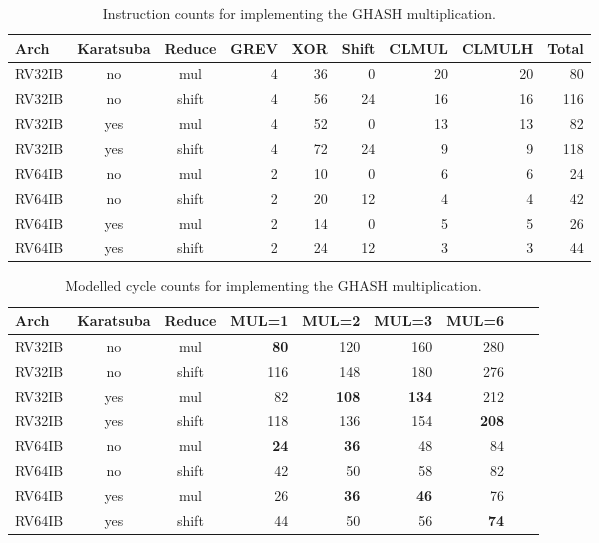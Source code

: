 \begin{table}
\centering
\begin{tabular}{lccrrrrrr}
Arch  & Karatsuba & Reduce & GREV & XOR & Shift & CLMUL & CLMULH & Total \\
\hline
RV32IB&   no      &   mul  &   4  & 36  &   0   &   20  &   20   & 80    \\
RV32IB&   no      & shift  &   4  & 56  &   24  &   16  &   16   & 116   \\
RV32IB&   yes     &   mul  &   4  & 52  &   0   &   13  &   13   & 82    \\
RV32IB&   yes     & shift  &   4  & 72  &   24  &   9   &   9    & 118   \\
\hline
RV64IB&   no      &   mul  &   2  & 10  &   0   &   6   &   6    & 24    \\
RV64IB&   no      & shift  &   2  & 20  &   12  &   4   &   4    & 42    \\
RV64IB&   yes     &   mul  &   2  & 14  &   0   &   5   &   5    & 26    \\
RV64IB&   yes     & shift  &   2  & 24  &   12  &   3   &   3    & 44    \\
\end{tabular}
\caption{
    Instruction counts for implementing the GHASH multiplication.
}
\label{tab:gcm:instrs}
\end{table}


\begin{table}
\centering
\begin{tabular}{lccrrrrrr}
Arch  & Karatsuba & Reduce &   MUL=1  &   MUL=2   &   MUL=3   &    MUL=6   \\
\hline
RV32IB&   no      &   mul  & {\bf 80} &      120  &      160  &      280   \\
RV32IB&   no      & shift  &     116  &      148  &      180  &      276   \\
RV32IB&   yes     &   mul  &      82  & {\bf 108} & {\bf 134} &      212   \\
RV32IB&   yes     & shift  &     118  &      136  &      154  & {\bf 208}  \\
\hline
RV64IB&   no      &   mul  & {\bf 24} & {\bf  36} &       48  &       84   \\
RV64IB&   no      & shift  &      42  &       50  &       58  &       82   \\
RV64IB&   yes     &   mul  &      26  & {\bf  36} & {\bf  46} &       76   \\
RV64IB&   yes     & shift  &      44  &       50  &       56  & {\bf  74}  \\
\end{tabular}
\caption{
    Modelled cycle counts for implementing the GHASH multiplication.
}
\label{tab:gcm:cycles}
\end{table}
